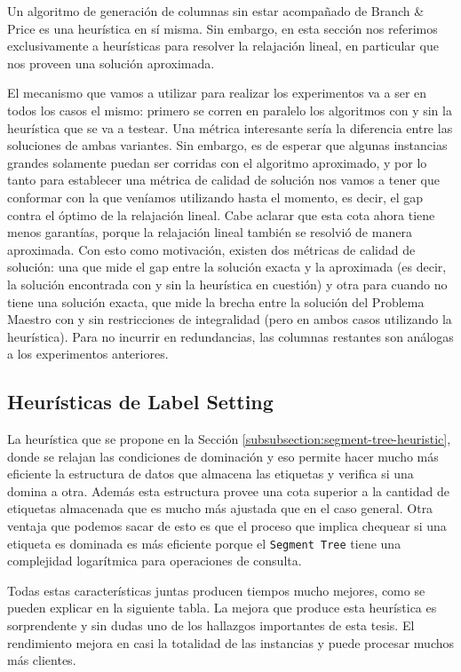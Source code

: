 Un algoritmo de generación de columnas sin estar acompañado de Branch \& Price es una heurística en sí misma. Sin embargo, en esta sección nos referimos exclusivamente a heurísticas para resolver la relajación lineal, en particular que nos proveen una solución aproximada. 

El mecanismo que vamos a utilizar para realizar los experimentos va a ser en todos los casos el mismo: primero se corren en paralelo los algoritmos con y sin la heurística que se va a testear. Una métrica interesante sería la diferencia entre las soluciones de ambas variantes. Sin embargo, es de esperar que algunas instancias grandes solamente puedan ser corridas con el algoritmo aproximado, y por lo tanto para establecer una métrica de calidad de solución nos vamos a tener que conformar con la que veníamos utilizando hasta el momento, es decir, el gap contra el óptimo de la relajación lineal. Cabe aclarar que esta cota ahora tiene menos garantías, porque la relajación lineal también se resolvió de manera aproximada. Con esto como motivación, existen dos métricas de calidad de solución: una que mide el gap entre la solución exacta y la aproximada (es decir, la solución encontrada con y sin la heurística en cuestión) y otra para cuando no tiene una solución exacta, que mide la brecha entre la solución del Problema Maestro con y sin restricciones de integralidad (pero en ambos casos utilizando la heurística). Para no incurrir en redundancias, las columnas restantes son análogas a los experimentos anteriores.

\subsection{Heurísticas de Label Setting}
\label{section:experiments-label-setting-heur}

La heurística que se propone en la Sección \ref{subsubsection:segment-tree-heuristic}, donde se relajan las condiciones de dominación y eso permite hacer mucho más eficiente la estructura de datos que almacena las etiquetas y verifica si una domina a otra. Además esta estructura provee una cota superior a la cantidad de etiquetas almacenada que es mucho más ajustada que en el caso general. Otra ventaja que podemos sacar de esto es que el proceso que implica chequear si una etiqueta es dominada es más eficiente porque el \texttt{Segment Tree} tiene una complejidad logarítmica para operaciones de consulta. 

Todas estas características juntas producen tiempos mucho mejores, como se pueden explicar en la siguiente tabla. La mejora que produce esta heurística es sorprendente y sin dudas uno de los hallazgos importantes de esta tesis. El rendimiento mejora en casi la totalidad de las instancias y puede procesar muchos más clientes.

